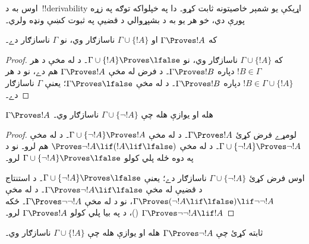 \documentclass[../../../include/open-logic-section]{subfiles}
\begin{document}
      {}
      {}


اوس به د~!!{derivability} اړيکې يو شمېر خاصيتونه ثابت کړو۔ دا په
خپلواکه توګه په زړه پورې دي، خو هر يو به د بشپړوالي د قضیې په
ثبوت کښې ونډه ولري۔

\begin{prop}
  که $\Gamma \Proves !A$ او $\Gamma \cup \{!A\}$ ناسازګار وي، نو
  $\Gamma$ ناسازګار دے۔
\end{prop}

\begin{proof}
  که $\Gamma \cup \{!A\}$ ناسازګار وي، نو
  $\Gamma \cup \{!A\} \Proves \lfalse$۔ د
   له مخې د هر $!B \in \Gamma$ دپاره
  $\Gamma \Proves !B$۔ د فرض له مخې $\Gamma \Proves !A$ هم دے،
  نو د هر $!B \in \Gamma \cup \{!A\}$ دپاره
  $\Gamma \Proves !B$۔ د  له مخې
  $\Gamma \Proves \lfalse$؛ يعنې $\Gamma$ ناسازګار دے۔
\end{proof}

\begin{prop}
$\Gamma \Proves !A$ هله او يوازې هله چې
$\Gamma \cup \{\lnot !A\}$ ناسازګار وي۔
\end{prop}

\begin{proof}
لومړے فرض کړئ $\Gamma \Proves !A$۔ د
 له مخې
$\Gamma \cup \{\lnot !A\} \Proves !A$۔ د
 له مخې
$\Gamma \cup \{\lnot !A\} \Proves \lnot !A$۔ د
 له مخې
$\Proves \lnot !A \lif (!A \lif \lfalse)$ هم لرو۔ نو د
 په دوه ځله پلي کولو
$\Gamma \cup \{\lnot !A\} \Proves \lfalse$ لرو۔

اوس فرض کړئ $\Gamma \cup \{\lnot !A\}$ ناسازګار دے؛ يعنې
$\Gamma \cup \{\lnot !A\} \Proves \lfalse$۔ د استنتاج د قضیې له
مخې $\Gamma \Proves \lnot !A \lif \lfalse$۔ د
 له مخې
$\Gamma \Proves (\lnot !A \lif \lfalse) \lif \lnot\lnot !A$، نو
د  له مخې $\Gamma \Proves \lnot\lnot !A$۔
ځکه $\Gamma \Proves \lnot\lnot !A \lif !A$
()، د  په بيا پلي کولو
$\Gamma \Proves !A$ لرو۔
\end{proof}

\begin{prob}
ثابته کړئ چې $\Gamma \Proves \lnot !A$ هله او يوازې هله چې
$\Gamma \cup \{!A\}$ ناسازګار وي۔
\end{prob}
\end{document}

